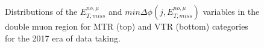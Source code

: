 \begin{figure}[htbp]
{    }
  \caption{Distributions of the $E_{T,miss}^{no,\mu}$ and $min\Delta\phi(j,E_{T,miss}^{no,\mu})$ variables in the double muon region for MTR (top) and VTR (bottom) categories for the 2017 era of data taking.}
  \label{fig:2017_Zmumu_2}
\end{figure}


